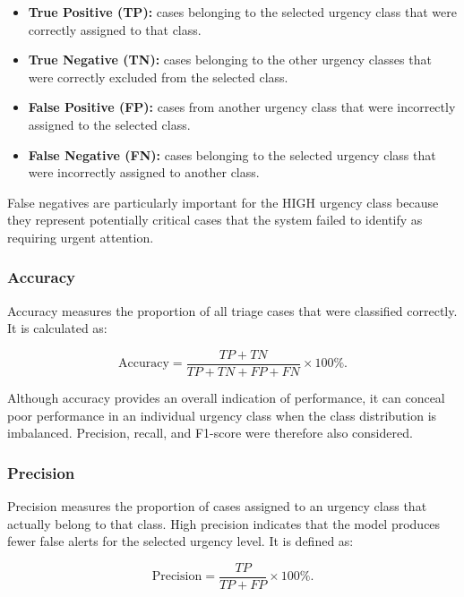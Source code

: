 \begin{itemize}
    \item \textbf{True Positive (TP):} cases belonging to the selected urgency class that were correctly assigned to that class.
    \item \textbf{True Negative (TN):} cases belonging to the other urgency classes that were correctly excluded from the selected class.
    \item \textbf{False Positive (FP):} cases from another urgency class that were incorrectly assigned to the selected class.
    \item \textbf{False Negative (FN):} cases belonging to the selected urgency class that were incorrectly assigned to another class.
\end{itemize}

False negatives are particularly important for the HIGH urgency class because they represent potentially critical cases that the system failed to identify as requiring urgent attention.

\subsubsection{Accuracy}
Accuracy measures the proportion of all triage cases that were classified correctly. It is calculated as:

\begin{equation}
    \mathrm{Accuracy} = \frac{TP + TN}{TP + TN + FP + FN} \times 100\%.
    \label{eq:accuracy}
\end{equation}

Although accuracy provides an overall indication of performance, it can conceal poor performance in an individual urgency class when the class distribution is imbalanced. Precision, recall, and F1-score were therefore also considered.

\subsubsection{Precision}
Precision measures the proportion of cases assigned to an urgency class that actually belong to that class. High precision indicates that the model produces fewer false alerts for the selected urgency level. It is defined as:

\begin{equation}
    \mathrm{Precision} = \frac{TP}{TP + FP} \times 100\%.
    \label{eq:precision}
\end{equation}

